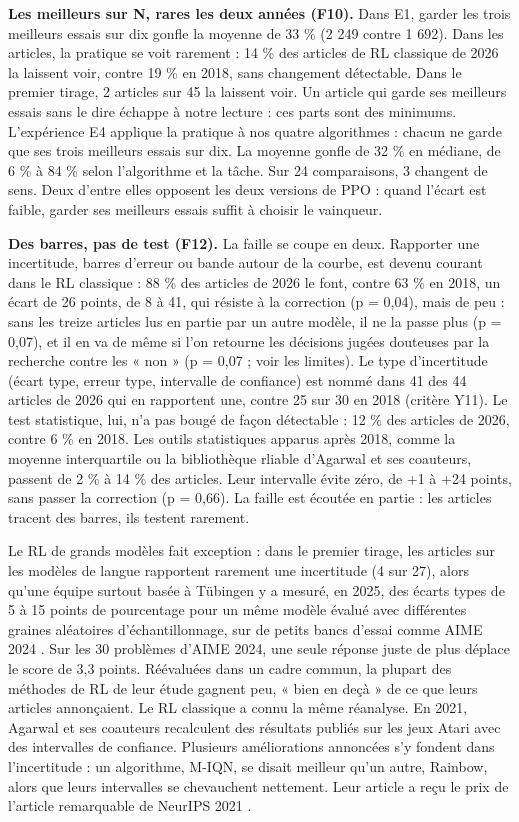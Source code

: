 \documentclass[11pt,a4paper]{article}
\begin{document}
\textbf{Les meilleurs sur N, rares les deux années (F10).} Dans E1,
garder les trois meilleurs essais sur dix gonfle la moyenne de 33 \% (2
249 contre 1 692). Dans les articles, la pratique se voit rarement : 14
\% des articles de RL classique de 2026 la laissent voir, contre 19 \%
en 2018, sans changement détectable. Dans le premier tirage, 2 articles
sur 45 la laissent voir. Un article qui garde ses meilleurs essais sans
le dire échappe à notre lecture : ces parts sont des minimums.
L'expérience E4 applique la pratique à nos quatre algorithmes : chacun
ne garde que ses trois meilleurs essais sur dix. La moyenne gonfle de 32
\% en médiane, de 6 \% à 84 \% selon l'algorithme et la tâche. Sur 24
comparaisons, 3 changent de sens. Deux d'entre elles opposent les deux
versions de PPO : quand l'écart est faible, garder ses meilleurs essais
suffit à choisir le vainqueur.

\textbf{Des barres, pas de test (F12).} La faille se coupe en deux.
Rapporter une incertitude, barres d'erreur ou bande autour de la courbe,
est devenu courant dans le RL classique : 88 \% des articles de 2026 le
font, contre 63 \% en 2018, un écart de 26 points, de 8 à 41, qui
résiste à la correction (p = 0,04), mais de peu : sans les treize
articles lus en partie par un autre modèle, il ne la passe plus (p =
0,07), et il en va de même si l'on retourne les décisions jugées
douteuses par la recherche contre les « non » (p = 0,07 ; voir les
limites). Le type d'incertitude (écart type, erreur type, intervalle de
confiance) est nommé dans 41 des 44 articles de 2026 qui en rapportent
une, contre 25 sur 30 en 2018 (critère Y11). Le test statistique, lui,
n'a pas bougé de façon détectable : 12 \% des articles de 2026, contre 6
\% en 2018. Les outils statistiques apparus après 2018, comme la moyenne
interquartile ou la bibliothèque rliable d'Agarwal et ses coauteurs,
passent de 2 \% à 14 \% des articles. Leur intervalle évite zéro, de +1
à +24 points, sans passer la correction (p = 0,66). La faille est
écoutée en partie : les articles tracent des barres, ils testent
rarement.

Le RL de grands modèles fait exception : dans le premier tirage, les
articles sur les modèles de langue rapportent rarement une incertitude
(4 sur 27), alors qu'une équipe surtout basée à Tübingen y a mesuré, en
2025, des écarts types de 5 à 15 points de pourcentage pour un même
modèle évalué avec différentes graines aléatoires d'échantillonnage, sur
de petits bancs d'essai comme AIME 2024 \autocite{hochlehnert2025sober}.
Sur les 30 problèmes d'AIME 2024, une seule réponse juste de plus
déplace le score de 3,3 points. Réévaluées dans un cadre commun, la
plupart des méthodes de RL de leur étude gagnent peu, « bien en deçà »
de ce que leurs articles annonçaient. Le RL classique a connu la même
réanalyse. En 2021, Agarwal et ses coauteurs recalculent des résultats
publiés sur les jeux Atari avec des intervalles de confiance. Plusieurs
améliorations annoncées s'y fondent dans l'incertitude : un algorithme,
M-IQN, se disait meilleur qu'un autre, Rainbow, alors que leurs
intervalles se chevauchent nettement. Leur article a reçu le prix de
l'article remarquable de NeurIPS 2021 \autocite{agarwal2021precipice}.
\end{document}
